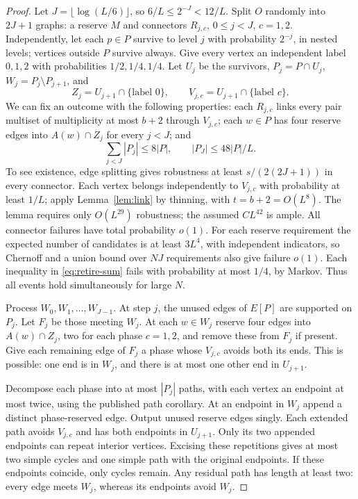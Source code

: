 \documentclass[11pt]{article}
\theoremstyle{remark}\newtheorem*{remark}{Remark}
\begin{document}
\begin{proof}
Let $J=\lfloor\log(L/6)\rfloor$, so $6/L\le2^{-J}<12/L$.
Split $O$ randomly into $2J+1$ graphs: a reserve $M$ and connectors
$R_{j,c}$, $0\le j<J$, $c=1,2$.
Independently, let each $p\in P$ survive to level $j$ with probability
$2^{-j}$, in nested levels; vertices outside $P$ survive always.
Give every vertex an independent label $0,1,2$ with probabilities
$1/2,1/4,1/4$. Let $U_j$ be the survivors,
$P_j=P\cap U_j$, $W_j=P_j\setminus P_{j+1}$, and
\[
 Z_j=U_{j+1}\cap\{\text{label }0\},\qquad
 V_{j,c}=U_{j+1}\cap\{\text{label }c\}.
\]
We can fix an outcome with the following properties: each $R_{j,c}$
links every pair multiset of multiplicity at most $b+2$ through
$V_{j,c}$; each $w\in P$ has four reserve edges into $A(w)\cap Z_j$
for every $j<J$; and
\begin{equation}\label{eq:retire-sum}
 \sum_{j<J}|P_j|\le8|P|,\qquad |P_J|\le48|P|/L.
\end{equation}
To see existence, edge splitting gives robustness at least
$s/(2(2J+1))$ in every connector. Each vertex belongs independently
to $V_{j,c}$ with probability at least $1/L$; apply
Lemma~\ref{lem:link} by thinning, with $t=b+2=O(L^8)$.
The lemma requires only $O(L^{29})$ robustness; the assumed $CL^{42}$
is ample. All connector failures have total probability $o(1)$.
For each reserve requirement the expected number of candidates is at
least $3L^4$, with independent indicators, so Chernoff and a union bound
over $NJ$ requirements also give failure $o(1)$.
Each inequality in \eqref{eq:retire-sum} fails with probability at most
$1/4$, by Markov. Thus all events hold simultaneously for large $N$.

Process $W_0,W_1,\ldots,W_{J-1}$. At step $j$, the unused edges of
$E[P]$ are supported on $P_j$. Let $F_j$ be those meeting $W_j$.
At each $w\in W_j$ reserve four edges into $A(w)\cap Z_j$, two for
each phase $c=1,2$, and remove these from $F_j$ if present.
Give each remaining edge of $F_j$ a phase whose $V_{j,c}$ avoids both
its ends. This is possible: one end is in $W_j$, and there is at most
one other end in $U_{j+1}$.

Decompose each phase into at most $|P_j|$ paths, with each vertex an
endpoint at most twice, using the published path corollary.
At an endpoint in $W_j$ append a distinct phase-reserved edge.
Output unused reserve edges singly. Each extended path avoids
$V_{j,c}$ and has both endpoints in $U_{j+1}$.
Only its two appended endpoints can repeat interior vertices. Excising
these repetitions gives at most two simple cycles and one simple path
with the original endpoints. If these endpoints coincide, only cycles
remain. Any residual path has length at least two: every edge meets
$W_j$, whereas its endpoints avoid $W_j$.


\end{proof}
\end{document}
